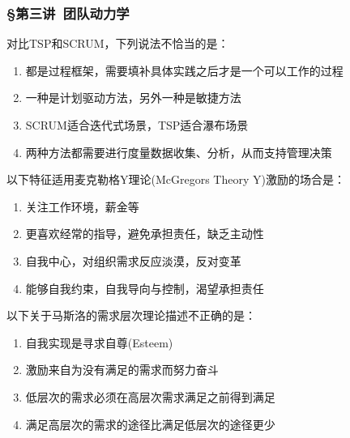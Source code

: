 \subsubsection*{\S 第三讲\ 团队动力学}
\setcounter{problemname}{0}

\begin{problem}
	对比TSP和SCRUM，下列说法不恰当的是： 
        \begin{enumerate}[label=\Alph*.]
            \item 都是过程框架，需要填补具体实践之后才是一个可以工作的过程
            \item 一种是计划驱动方法，另外一种是敏捷方法
            \item SCRUM适合迭代式场景，TSP适合瀑布场景
            \item 两种方法都需要进行度量数据收集、分析，从而支持管理决策
        \end{enumerate}
\end{problem}




\begin{problem}
	以下特征适用麦克勒格Y理论(McGregors Theory Y)激励的场合是：
        \begin{enumerate}[label=\Alph*.]
            \item 关注工作环境，薪金等
            \item 更喜欢经常的指导，避免承担责任，缺乏主动性
            \item 自我中心，对组织需求反应淡漠，反对变革
            \item 能够自我约束，自我导向与控制，渴望承担责任
        \end{enumerate}
\end{problem}



\begin{problem}
	以下关于马斯洛的需求层次理论描述不正确的是：
        \begin{enumerate}[label=\Alph*.]
            \item 自我实现是寻求自尊(Esteem)
            \item 激励来自为没有满足的需求而努力奋斗
            \item 低层次的需求必须在高层次需求满足之前得到满足
            \item 满足高层次的需求的途径比满足低层次的途径更少
        \end{enumerate}
\end{problem}



